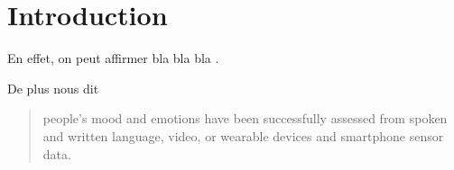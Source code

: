 \documentclass[12pt]{article}
\begin{document}

\thispagestyle{empty}


\tableofcontents
\newpage
\setcounter{page}{1}

\section*{Introduction}

En effet, on peut affirmer \og bla bla bla \fg {}.

De plus  nous dit

  \begin{quote}
    \singlespacing
  [...] people’s mood and emotions have been successfully assessed from spoken and written language, video, or wearable devices and smartphone sensor data.
  \end{quote}


\newpage



\end{document}
